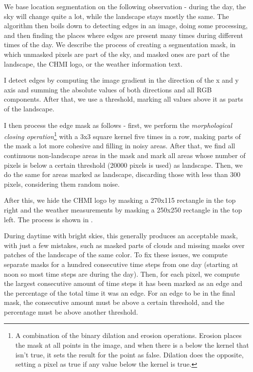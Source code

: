 We base location segmentation on the following observation - during the day, the sky will change quite a lot, while the landscape stays mostly the same. The algorithm then boils down to detecting edges in an image, doing some processing, and then finding the places where edges are present many times during different times of the day. We describe the process of creating a segmentation mask, in which unmasked pixels are part of the sky, and masked ones are part of the landscape, the CHMI logo, or the weather information text.

I detect edges by computing the image gradient in the direction of the x and y axis and summing the absolute values of both directions and all RGB components. After that, we use a threshold, marking all values above it as parts of the landscape.

I then process the edge mask as follows - first, we perform the \textit{morphological closing operation}\footnote{A combination of the binary dilation and erosion operations. Erosion places the mask at all points in the image, and when there is a below the kernel that isn't true, it sets the result for the point as false. Dilation does the opposite, setting a pixel as true if any value below the kernel is true.} with a 3x3 square kernel five times in a row, making parts of the mask a lot more cohesive and filling in noisy areas. After that, we find all continuous non-landscape areas in the mask and mark all areas whose number of pixels is below a certain threshold (20000 pixels is used) as landscape. Then, we do the same for areas marked as landscape, discarding those with less than 300 pixels, considering them random noise.

After this, we hide the CHMI logo by masking a 270x115 rectangle in the top right and the weather measurements by masking a 250x250 rectangle in the top left. The process is shown in .


During daytime with bright skies, this generally produces an acceptable mask, with just a few mistakes, such as masked parts of clouds and missing masks over patches of the landscape of the same color. To fix these issues, we compute separate masks for a hundred consecutive time steps from one day (starting at noon so most time steps are during the day). Then, for each pixel, we compute the largest consecutive amount of time steps it has been marked as an edge and the percentage of the total time it was an edge. For an edge to be in the final mask, the consecutive amount must be above a certain threshold, and the percentage must be above another threshold.

